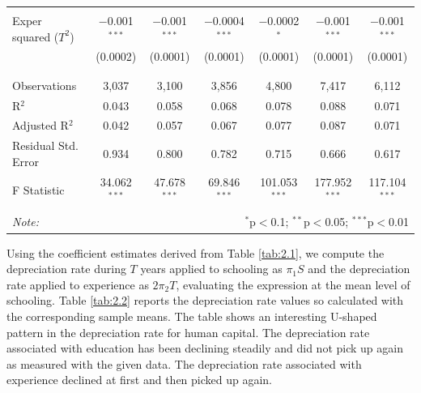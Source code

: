 \documentclass[12pt,a4paper]{article}
\numberwithin{equation}{section}
\begin{document}
\begin{table}[h!]
\begin{tabular}{@{\extracolsep{3pt}}lcccccc}
		& & & & & & \\ 
		Exper squared ($T^2$) & $-$0.001$^{***}$ & $-$0.001$^{***}$ & $-$0.0004$^{***}$ & $-$0.0002$^{*}$ & $-$0.001$^{***}$ & $-$0.001$^{***}$ \\ 
		& (0.0002) & (0.0001) & (0.0001) & (0.0001) & (0.0001) & (0.0001) \\ 
		& & & & & & \\ 
		\hline \\[-1.8ex] 
		Observations & 3,037 & 3,100 & 3,856 & 4,800 & 7,417 & 6,112 \\ 
		R$^{2}$ & 0.043 & 0.058 & 0.068 & 0.078 & 0.088 & 0.071 \\ 
		Adjusted R$^{2}$ & 0.042 & 0.057 & 0.067 & 0.077 & 0.087 & 0.071 \\ 
		Residual Std. Error & 0.934 & 0.800 & 0.782 & 0.715 & 0.666 & 0.617 \\ 
		F Statistic & 34.062$^{***}$ & 47.678$^{***}$ & 69.846$^{***}$ & 101.053$^{***}$ & 177.952$^{***}$ & 117.104$^{***}$ \\ 
		\hline 
		\hline \\[-1.8ex] 
		\textit{Note:}  & \multicolumn{6}{r}{$^{*}$p$<$0.1; $^{**}$p$<$0.05; $^{***}$p$<$0.01} \\ 
	\end{tabular} 
\end{table}


Using the coefficient estimates derived from Table \ref{tab:2.1}, we compute the depreciation rate during $T$ years applied to schooling as $\pi_{1}S $ and the depreciation rate applied to experience as $ 2\pi_{2}T$, evaluating the expression at the mean level of schooling. Table \ref{tab:2.2} reports the depreciation rate values so calculated with the corresponding sample means. The table shows an interesting U-shaped pattern in the depreciation rate for human capital. The depreciation rate associated with education has been declining steadily and did not pick up again as measured with the given data. The depreciation rate associated with experience declined at first and then picked up again. 
\end{document}
